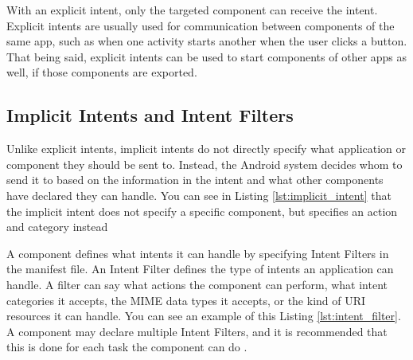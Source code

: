     
    
    With an explicit intent, only the targeted component can receive the intent. Explicit intents are usually used for communication between components of the same app, such as when one activity starts another when the user clicks a button. That being said, explicit intents can be used to start components of other apps as well, if those components are exported.
    
    \subsection{Implicit Intents and Intent Filters}
        \label{subsec:implicit_intents}
        
    Unlike explicit intents, implicit intents do not directly specify what application or component they should be sent to. Instead, the Android system decides whom to send it to based on the information in the intent and what other components have declared they can handle. You can see in Listing \ref{lst:implicit_intent} that the implicit intent does not specify a specific component, but specifies an action and category instead
    
    A component defines what intents it can handle by specifying Intent Filters in the manifest file. An Intent Filter defines the type of intents an application can handle. A filter can say what actions the component can perform, what intent categories it accepts, the MIME data types it accepts, or the kind of URI resources it can handle. You can see an example of this Listing \ref{lst:intent_filter}. A component may declare multiple Intent Filters, and it is recommended that this is done for each task the component can do \cite{intents_and_intent_filters}.
    
    
    
    
    
